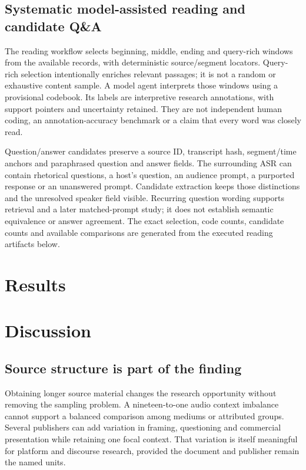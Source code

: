 \subsection{Systematic model-assisted reading and candidate Q\&A}
The reading workflow selects beginning, middle, ending and query-rich windows from the available records, with deterministic source/segment locators. Query-rich selection intentionally enriches relevant passages; it is not a random or exhaustive content sample. A model agent interprets those windows using a provisional codebook. Its labels are interpretive research annotations, with support pointers and uncertainty retained. They are not independent human coding, an annotation-accuracy benchmark or a claim that every word was closely read.

Question/answer candidates preserve a source ID, transcript hash, segment/time anchors and paraphrased question and answer fields. The surrounding ASR can contain rhetorical questions, a host's question, an audience prompt, a purported response or an unanswered prompt. Candidate extraction keeps those distinctions and the unresolved speaker field visible. Recurring question wording supports retrieval and a later matched-prompt study; it does not establish semantic equivalence or answer agreement. The exact selection, code counts, candidate counts and available comparisons are generated from the executed reading artifacts below.

\section{Results}

\clearpage

\section{Discussion}
\subsection{Source structure is part of the finding}
Obtaining longer source material changes the research opportunity without removing the sampling problem. A nineteen-to-one audio context imbalance cannot support a balanced comparison among mediums or attributed groups. Several publishers can add variation in framing, questioning and commercial presentation while retaining one focal context. That variation is itself meaningful for platform and discourse research, provided the document and publisher remain the named units.

